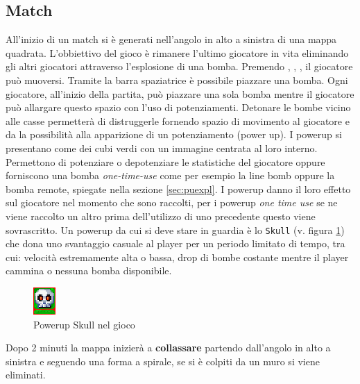 \documentclass[a4paper,12pt]{report}
\begin{document}
\subsection{Match}
All'inizio di un match si è generati nell'angolo in alto a sinistra di una mappa quadrata. L'obbiettivo del gioco è rimanere l'ultimo giocatore in vita eliminando gli altri giocatori attraverso l'esplosione di una bomba. 
\newline
Premendo , , ,  il giocatore può muoversi.
Tramite la barra spaziatrice  è possibile piazzare una bomba.
Ogni giocatore, all'inizio della partita, può piazzare una sola bomba mentre il giocatore può allargare questo spazio con l'uso di potenziamenti.
\newline
Detonare le bombe vicino alle casse permetterà di distruggerle fornendo spazio di movimento al giocatore e da la possibilità alla apparizione di un potenziamento (power up).
\newline
I powerup si presentano come dei cubi verdi con un immagine centrata al loro interno. Permettono di potenziare o depotenziare le statistiche del giocatore oppure forniscono una bomba \textit{one-time-use} come per esempio la line bomb
oppure la bomba remote, spiegate nella sezione \ref{sec:puexpl}.
I powerup danno il loro effetto sul giocatore nel momento che sono raccolti, per i powerup \textit{one time use} se ne viene raccolto un altro prima dell'utilizzo di uno precedente questo viene sovrascritto.
\newline
Un powerup da cui si deve stare in guardia è lo \texttt{Skull} (v. figura \ref{img:fig-skull}) che dona uno svantaggio casuale al player per un periodo limitato di tempo, tra cui: velocità estremamente alta o bassa, drop di bombe costante mentre il player cammina o nessuna bomba disponibile. 

\begin{figure}[h]
    \centering{}
    \includegraphics{img/powerups/skull.png}
    \caption{Powerup Skull nel gioco}
    \label{img:fig-skull}
\end{figure}
Dopo 2 minuti la mappa inizierà a \textbf{collassare} partendo dall'angolo in alto a sinistra e seguendo una forma a spirale, se si è colpiti da un muro si viene eliminati.
\end{document}
